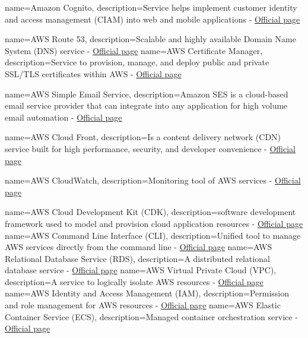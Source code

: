 {
        name=Amazon Cognito,
        description={Service helps implement customer identity and access management (CIAM) into web and mobile applications - \href{https://aws.amazon.com/cognito/}{Official page}}
}

{
        name=AWS Route 53,
        description={Scalable and highly available Domain Name System (DNS) service - \href{https://aws.amazon.com/route53/}{Official page}}
}
{
        name=AWS Certificate Manager,
        description={Service to provision, manage, and deploy public and private SSL/TLS certificates within AWS - \href{https://aws.amazon.com/certificate-manager/}{Official page}}
}

{
        name=AWS Simple Email Service,
        description={Amazon SES is a cloud-based email service provider that can integrate into any application for high volume email automation - \href{https://aws.amazon.com/ses/}{Official page}}
}

{
        name=AWS Cloud Front,
        description={Is a content delivery network (CDN) service built for high performance, security, and developer convenience - \href{https://aws.amazon.com/cloudfront/}{Official page}}
}

{
        name=AWS CloudWatch,
        description={Monitoring tool of AWS services - \href{https://www.google.com/search?client=safari&rls=en&q=aws+cloudwatch&ie=UTF-8&oe=UTF-8}{Official page}}
}

{
        name=AWS Cloud Development Kit (CDK),
        description={software development framework used to model and provision cloud application resources  - \href{https://aws.amazon.com/cdk/}{Official page}}
}
{
        name=AWS Command Line Interface (CLI),
        description={Unified tool to manage AWS services directly from the command line - \href{https://aws.amazon.com/cli/}{Official page}}
}
{
        name=AWS Relational Database Service (RDS),
        description={A distributed relational database service - \href{https://aws.amazon.com/rds/}{Official page}}
}
{
        name=AWS Virtual Private Cloud (VPC),
        description={A service to logically isolate AWS resources - \href{https://docs.aws.amazon.com/vpc/latest/userguide/what-is-amazon-vpc.html}{Official page}}
}
{
        name=AWS Identity and Access Management (IAM),
        description={Permission and role management for AWS resources - \href{https://aws.amazon.com/iam/}{Official page}}
}
{
        name=AWS Elastic Container Service (ECS),
        description={Managed container orchestration service - \href{https://aws.amazon.com/ecs/}{Official page}}
}

